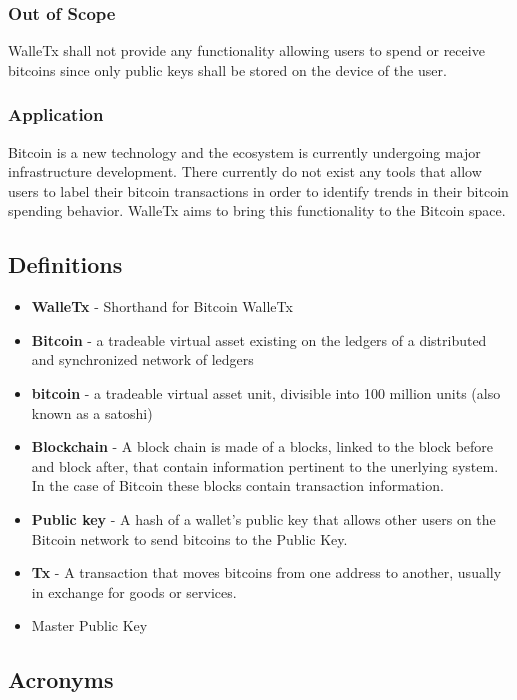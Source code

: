   \subsubsection{Out of Scope}
  WalleTx shall not provide any functionality allowing users to spend or receive bitcoins since only public keys shall be stored on the device of the user.
	
  \subsubsection{Application} 
  Bitcoin is a new technology and the ecosystem is currently undergoing major infrastructure development. There currently do not exist any tools that allow users to label their bitcoin transactions in order to identify trends in their bitcoin spending behavior. WalleTx aims to bring this functionality to the Bitcoin space.
    
	\subsection{Definitions}

	\begin{itemize}
    \item \textbf{WalleTx} - Shorthand for Bitcoin WalleTx
    \item \textbf{Bitcoin} - a tradeable virtual asset existing on the ledgers of a distributed and synchronized network of ledgers
    \item \textbf{bitcoin} - a tradeable virtual asset unit, divisible into 100 million units (also known as a satoshi) 
    \item \textbf{Blockchain} - A block chain is made of a blocks, linked to the block before and block after, that contain information pertinent to the unerlying system. In the case of Bitcoin these blocks contain transaction information.
    \item \textbf{Public key} - A hash of a wallet's public key that allows other users on the Bitcoin network to send bitcoins to the Public Key. 
    \item \textbf{Tx} - A transaction that moves bitcoins from one address to another, usually in exchange for goods or services.
    \item Master Public Key
	\end{itemize}

	\subsection{Acronyms}


